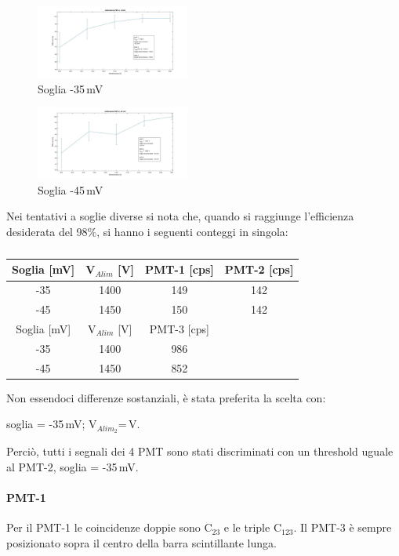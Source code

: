 \documentclass[a4paper,twocolumn]{article}
\begin{document}
\begin{figure}[H]
\includegraphics[width=0.45\textwidth]{./immagini/TimeOfFlight/EffPMT235mV.jpg}
\caption{Soglia -35\,mV}
\label{fig:EffPMT235mV}
\end{figure}
\begin{figure}[H]
\includegraphics[width=0.45\textwidth]{./immagini/TimeOfFlight/EffPMT245mV.jpg}
\caption{Soglia -45\,mV}
\label{fig:EffPMT245mV}
\end{figure}

Nei tentativi a soglie diverse si nota che, quando si raggiunge l'efficienza desiderata del 98$\%$, si hanno i seguenti conteggi in singola:

\begin{table}[H]
\begin{tabular}{|c|c|c|c|}
\hline
Soglia [mV] & V$_{Alim}$ [V] & PMT-1 [cps] & PMT-2 [cps] \\
\hline
-35 & 1400 & 149 & 142\\
-45 & 1450 & 150 & 142\\
\hline
\hline
Soglia [mV] & V$_{Alim}$ [V] & PMT-3 [cps] &   \\
\hline
-35 & 1400 & 986 &\\
-45 & 1450 & 852 &\\
\hline
\end{tabular}
\caption{}
\end{table}

Non essendoci differenze sostanziali, è stata preferita la scelta con:

\begin{center}
soglia = -35\,mV; V$_{Alim_2}$\:=\,V.
\end{center}

Perciò, tutti i segnali dei 4 PMT sono stati discriminati con un threshold uguale al PMT-2, soglia = -35\,mV.


\paragraph{PMT-1}
Per il PMT-1 le coincidenze doppie sono C$_{23}$ e le triple C$_{123}$. Il PMT-3 è sempre posizionato sopra il centro della barra scintillante lunga.
\end{document}
